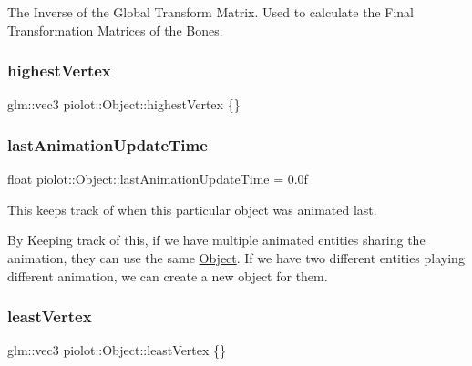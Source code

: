 The Inverse of the Global Transform Matrix. Used to calculate the Final Transformation Matrices of the Bones. 

\mbox{\label{classpiolot_1_1_object_a6862a74fc8184327a0f763578f4a7532}} 
\subsubsection{\texorpdfstring{highest\+Vertex}{highestVertex}}
{\footnotesize\ttfamily glm\+::vec3 piolot\+::\+Object\+::highest\+Vertex \{\}\hspace{0.3cm}{\ttfamily [protected]}}

\mbox{\label{classpiolot_1_1_object_addfd3a255444e86bab978e3e9ee27d37}} 
\subsubsection{\texorpdfstring{last\+Animation\+Update\+Time}{lastAnimationUpdateTime}}
{\footnotesize\ttfamily float piolot\+::\+Object\+::last\+Animation\+Update\+Time = 0.\+0f\hspace{0.3cm}{\ttfamily [protected]}}



This keeps track of when this particular object was animated last. 

By Keeping track of this, if we have multiple animated entities sharing the animation, they can use the same \mbox{\hyperlink{classpiolot_1_1_object}{Object}}. If we have two different entities playing different animation, we can create a new object for them. \mbox{\label{classpiolot_1_1_object_a44fd0867a8daca738c9b798181e9c48b}} 
\subsubsection{\texorpdfstring{least\+Vertex}{leastVertex}}
{\footnotesize\ttfamily glm\+::vec3 piolot\+::\+Object\+::least\+Vertex \{\}\hspace{0.3cm}{\ttfamily [protected]}}

